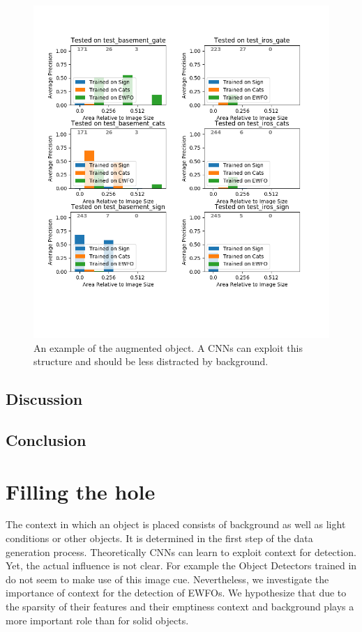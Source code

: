 \begin{figure}
	\includegraphics[width=\textwidth]{fig/basement_cats_size}
	\caption{An example of the augmented object. A \acp{CNN} can exploit this structure and should be less distracted by background.}
	\label{fig:basement_cats}
\end{figure}

\subsection{Discussion}

\subsection{Conclusion}

\section{Filling the hole}

The context in which an object is placed consists of background as well as light conditions or other objects. It is determined in the first step of the data generation process. Theoretically \acp{CNN} can learn to exploit context for detection. Yet, the actual influence is not clear. For example the Object Detectors trained in \cite{Peng} do not seem to make use of this image cue. Nevertheless, we investigate the importance of context for the detection of \acp{EWFO}. We hypothesize that due to the sparsity of their features and their emptiness context and background plays a more important role than for solid objects.

